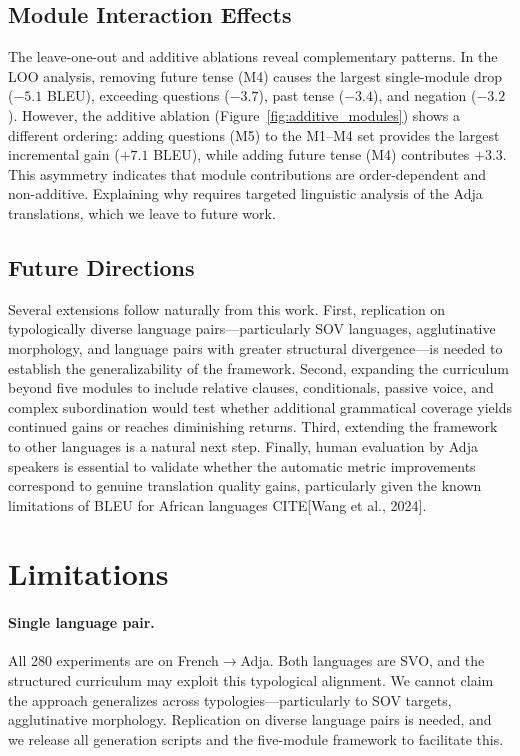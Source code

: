 \documentclass[11pt]{article}
\begin{document}
\subsection{Module Interaction Effects}

The leave-one-out and additive ablations reveal complementary patterns. In the LOO analysis, removing future tense (M4) causes the largest single-module drop ($-5.1$ BLEU), exceeding questions ($-3.7$), past tense ($-3.4$), and negation ($-3.2$). However, the additive ablation (Figure~\ref{fig:additive_modules}) shows a different ordering: adding questions (M5) to the M1--M4 set provides the largest incremental gain ($+7.1$ BLEU), while adding future tense (M4) contributes $+3.3$. This asymmetry indicates that module contributions are order-dependent and non-additive. Explaining why requires targeted linguistic analysis of the Adja translations, which we leave to future work.

\subsection{Future Directions}

Several extensions follow naturally from this work. First, replication on typologically diverse language pairs---particularly SOV languages, agglutinative morphology, and language pairs with greater structural divergence---is needed to establish the generalizability of the framework. Second, expanding the curriculum beyond five modules to include relative clauses, conditionals, passive voice, and complex subordination would test whether additional grammatical coverage yields continued gains or reaches diminishing returns. Third, extending the framework to other languages is a natural next step. Finally, human evaluation by Adja speakers is essential to validate whether the automatic metric improvements correspond to genuine translation quality gains, particularly given the known limitations of BLEU for African languages CITE[Wang et al., 2024].

\section*{Limitations}

\paragraph{Single language pair.} All 280 experiments are on French$\rightarrow$Adja. Both languages are SVO, and the structured curriculum may exploit this typological alignment. We cannot claim the approach generalizes across typologies---particularly to SOV targets, agglutinative morphology. Replication on diverse language pairs is needed, and we release all generation scripts and the five-module framework to facilitate this.
\end{document}
